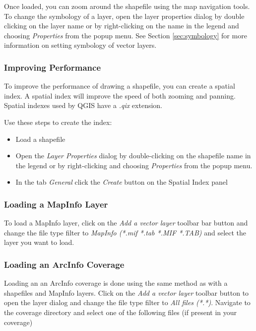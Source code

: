 Once loaded, you can zoom around the shapefile using the map navigation tools.
To change the symbology of a layer, open the layer properties dialog by double
clicking on the layer name or by right-clicking on the name in the legend and
choosing \textsl{Properties} from the popup menu. See
Section \ref{sec:symbology} for more information on setting symbology of
vector layers.
  
\subsubsection{Improving Performance}

To improve the performance of drawing a shapefile, you can create a spatial
index. A  spatial index will improve the 
speed of both zooming and panning. Spatial indexes used by QGIS have a 
\textsl{.qix} extension.

Use these steps to create the index:

\begin{itemize}
\item Load a shapefile
\item Open the \textit{Layer Properties} dialog by double-clicking on the
shapefile name in the legend or by right-clicking and choosing
\textit{Properties} from the popup menu.
\item In the tab \textit{General} click the \textit{Create} button on the Spatial Index panel
\end{itemize}

\subsubsection{Loading a MapInfo Layer}

To load a MapInfo layer, click on the \textit{Add a vector layer}
toolbar bar button and change the file type filter to \textit{MapInfo (*.mif
*.tab *.MIF *.TAB)} and select the layer you want to load.

\subsubsection{Loading an ArcInfo Coverage}

Loading an an ArcInfo coverage is done using the same method as with a
shapefiles and MapInfo layers. Click on the \textit{Add a vector layer}
toolbar button to open the layer dialog and change the file type filter to
\textit{All files (*.*)}.  Navigate to the coverage directory and select one
of the following files (if present in your coverage)


